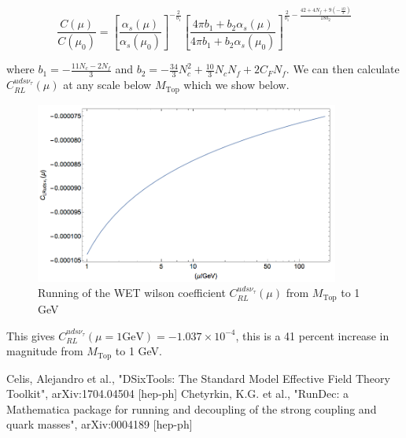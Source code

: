 \documentclass[aps,onecolumn,twoside,secnumarabic,balancelastpage,amsmath,amssymb,nofootinbib,hyperref=pdftex]{revtex4}
\begin{document}
\begin{equation}
\frac{C(\mu)}{C(\mu_0)} = \left[ \frac{\alpha_{s}(\mu)}{\alpha_{s}(\mu_0)}\right]^{-\frac{2}{b_1}}\left[ \frac{4\pi b_{1} + b_{2}\alpha_{s}(\mu)}{4\pi b_{1} + b_{2}\alpha_{s}(\mu_0)}\right]^{\frac{2}{b_1} - \frac{42 + 4N_{f}  + 9(-\frac{10}{3})}{18b_2}}
\end{equation}

where $b_1 = -\frac{11N_c - 2N_f}{3}$ and $b_2 = -\frac{34}{3}N^{2}_{c} + \frac{10}{3}N_{c}N_{f} + 2C_{F}N_{f}$. We can then calculate $C^{uds\nu_{\tau}}_{RL}(\mu)$ at any scale below $M_{\text{Top}}$ which we show below. 

\begin{figure}[htbp]
\begin{center}
\includegraphics[width=10cm]{wet_running_1GeV.png}
\caption{Running of the WET wilson coefficient $C^{uds\nu_{\tau}}_{RL}(\mu)$ from $M_{\text{Top}}$ to 1 GeV}
\label{default}
\end{center}
\end{figure}

This gives $C^{uds\nu_{\tau}}_{RL}(\mu = 1 \text{GeV}) = -1.037\times10^{-4}$, this is a 41 percent increase in magnitude from $M_{\text{Top}}$ to 1 GeV. 

\begin{thebibliography}{9}

 Celis, Alejandro et al., "DSixTools: The Standard Model Effective Field Theory Toolkit", arXiv:1704.04504 [hep-ph]
 Chetyrkin, K.G. et al., "RunDec: a Mathematica package for running and decoupling of the strong coupling and quark masses", arXiv:0004189 [hep-ph]

\end{thebibliography}
\end{document}

